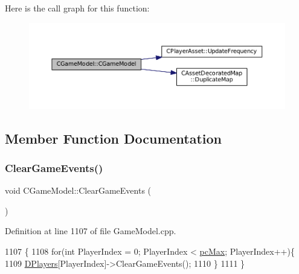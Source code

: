 Here is the call graph for this function\+:
\nopagebreak
\begin{figure}[H]
\begin{center}
\leavevmode
\includegraphics[width=350pt]{classCGameModel_a37858821d1294b21b374cf4f81052f3e_cgraph}
\end{center}
\end{figure}


\subsection{Member Function Documentation}
\hypertarget{classCGameModel_a7591a4e79f91a048462bce532fd4eca1}{}\label{classCGameModel_a7591a4e79f91a048462bce532fd4eca1} 
\subsubsection{\texorpdfstring{Clear\+Game\+Events()}{ClearGameEvents()}}
{\footnotesize\ttfamily void C\+Game\+Model\+::\+Clear\+Game\+Events (\begin{DoxyParamCaption}{ }\end{DoxyParamCaption})}



Definition at line 1107 of file Game\+Model.\+cpp.


\begin{DoxyCode}
1107                                 \{
1108     \textcolor{keywordflow}{for}(\textcolor{keywordtype}{int} PlayerIndex = 0; PlayerIndex < \hyperlink{GameDataTypes_8h_aafb0ca75933357ff28a6d7efbdd7602fa594a5c8dd3987f24e8a0f23f1a72cd34}{pcMax}; PlayerIndex++)\{
1109         \hyperlink{classCGameModel_a524436c3560b10e1c6d6fdd0b66565dc}{DPlayers}[PlayerIndex]->ClearGameEvents();
1110     \}
1111 \}
\end{DoxyCode}
\hypertarget{classCGameModel_af27947dce7cc0fa2dc9ec81872e26264}{}\label{classCGameModel_af27947dce7cc0fa2dc9ec81872e26264} 
